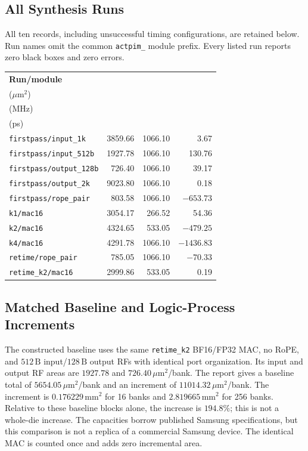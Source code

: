 \subsection{All Synthesis Runs}
All ten records, including unsuccessful timing configurations, are retained below. Run names omit the common \texttt{actpim\_} module prefix. Every listed run reports zero black boxes and zero errors.
\par\smallskip
{\centering\scriptsize\setlength{\tabcolsep}{4pt}
\begin{tabular}{@{}lrrr@{}}
\toprule
\textbf{Run/module} & \shortstack{\textbf{Cell area}\\($\mu\mathrm{m}^{2}$)} & \shortstack{\textbf{Target}\\(MHz)} & \shortstack{\textbf{Slack}\\(ps)} \\
\midrule
\texttt{firstpass/input\_1k} & 3859.66 & 1066.10 & 3.67 \\
\texttt{firstpass/input\_512b} & 1927.78 & 1066.10 & 130.76 \\
\texttt{firstpass/output\_128b} & 726.40 & 1066.10 & 39.17 \\
\texttt{firstpass/output\_2k} & 9023.80 & 1066.10 & 0.18 \\
\texttt{firstpass/rope\_pair} & 803.58 & 1066.10 & $-653.73$ \\
\texttt{k1/mac16} & 3054.17 & 266.52 & 54.36 \\
\texttt{k2/mac16} & 4324.65 & 533.05 & $-479.25$ \\
\texttt{k4/mac16} & 4291.78 & 1066.10 & $-1436.83$ \\
\texttt{retime/rope\_pair} & 785.05 & 1066.10 & $-70.33$ \\
\texttt{retime\_k2/mac16} & 2999.86 & 533.05 & 0.19 \\
\bottomrule
\end{tabular}\par}\smallskip

\subsection{Matched Baseline and Logic-Process Increments}
The constructed baseline uses the same \texttt{retime\_k2} BF16/FP32 MAC, no RoPE, and $512\,\mathrm{B}$ input/$128\,\mathrm{B}$ output RFs with identical port organization. Its input and output RF areas are $1927.78$ and $726.40\,\mu\mathrm{m}^{2}$/bank. The report gives a baseline total of $5654.05\,\mu\mathrm{m}^{2}$/bank and an increment of $11014.32\,\mu\mathrm{m}^{2}$/bank. The increment is $0.176229\,\mathrm{mm}^{2}$ for 16 banks and $2.819665\,\mathrm{mm}^{2}$ for 256 banks. Relative to these baseline blocks alone, the increase is $194.8\%$; this is not a whole-die increase. The capacities borrow published Samsung specifications, but this comparison is not a replica of a commercial Samsung device. The identical MAC is counted once and adds zero incremental area.

